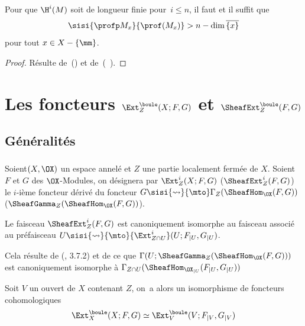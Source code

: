 \begin{corollaire} \label{V.3.6} Pour que $\H^{i}(M)$ soit de longueur finie pour~$i\leq n$, il faut et il suffit que
$$
\sisi{\profp M_{x}}{\prof(M_x)}>n-\dim\overline{\{ x\} }$$
pour tout $x\in X-\{ \mm\}$.
\end{corollaire}

\begin{proof}
R\'esulte de~() et de~(~).
\skipqed
\end{proof}

\chapter{Les foncteurs $\protect\Ext^{\protect\boule}_Z(X;F, G)$ et $\protect\SheafExt^{\protect\boule}_Z(F, G)$} \label{VI}


\section{G\'en\'eralit\'es} \label{VI.1}
\enlargethispage{\baselineskip}%
\subsection{} \label{VI.1.1}
Soient\pageoriginale $(X, \OX)$ un espace annel\'e et $Z$ une partie localement ferm\'ee de $X$. Soient $F$ et $G$ des $\OX$-Modules, on d\'esignera par ${\Ext_Z^i}(X;F, G)$ (\resp ${\SheafExt_Z^i}(F, G)$) le $i$-i\`eme foncteur d\'eriv\'e du foncteur $G \sisi{\rightsquigarrow}{\mto} \Gamma_Z(\SheafHom_{\OX}(F, G))$ (\resp $\SheafGamma_Z(\SheafHom_{\OX}(F, G))$).

\begin{lemme} \label{VI.1.2}
Le faisceau ${\SheafExt_Z^i}(F, G)$ est canoniquement isomorphe au faisceau associ\'e au pr\'efaisceau $U\sisi{\rightsquigarrow}{\mto} {\Ext_{Z\cap U}^i}(U;F_{|U}, G_{|U})$.
\end{lemme}

Cela r\'esulte de (, 3.7.2) et de ce que $\Gamma(U;\SheafGamma_Z(\SheafHom_{\OX}(F, G)))$ est canoniquement isomorphe \`a $\Gamma_{Z\cap U}(\SheafHom_{{\OX}_{|U}}(F_{|U}, G_{|U}))$

\begin{theoreme} \label{VI.1.3}
Soit $V$ un ouvert de $X$ contenant $Z$, on~a alors un isomorphisme de foncteurs cohomologiques
\begin{equation} \label{VI.1.3.1}
\Ext_{X}^{\boule}(X;F, G) \simeq \Ext_{V}^{\boule}(V;F_{|V}, G_{|V})
\end{equation}
\end{theoreme}

